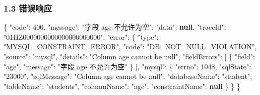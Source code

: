 \documentclass[
  a4paper,
  UTF8]{ctexart}
\newenvironment{Shaded}{}{}
\newcommand{\DataTypeTok}[1]{\textcolor[rgb]{0.56,0.13,0.00}{#1}}
\newcommand{\DecValTok}[1]{\textcolor[rgb]{0.25,0.63,0.44}{#1}}
\newcommand{\FunctionTok}[1]{\textcolor[rgb]{0.02,0.16,0.49}{#1}}
\newcommand{\KeywordTok}[1]{\textcolor[rgb]{0.00,0.44,0.13}{\textbf{#1}}}
\newcommand{\OtherTok}[1]{\textcolor[rgb]{0.00,0.44,0.13}{#1}}
\newcommand{\StringTok}[1]{\textcolor[rgb]{0.25,0.44,0.63}{#1}}
\begin{document}
\hypertarget{ux9519ux8befux54cdux5e94}{%
\subsubsection{1.3 错误响应}\label{ux9519ux8befux54cdux5e94}}

\begin{Shaded}
\begin{Highlighting}[]
\FunctionTok{\{}
  \DataTypeTok{"code"}\FunctionTok{:} \DecValTok{400}\FunctionTok{,}
  \DataTypeTok{"message"}\FunctionTok{:} \StringTok{"字段 age 不允许为空"}\FunctionTok{,}
  \DataTypeTok{"data"}\FunctionTok{:} \KeywordTok{null}\FunctionTok{,}
  \DataTypeTok{"traceId"}\FunctionTok{:} \StringTok{"01HZ0000000000000000000000"}\FunctionTok{,}
  \DataTypeTok{"error"}\FunctionTok{:} \FunctionTok{\{}
    \DataTypeTok{"type"}\FunctionTok{:} \StringTok{"MYSQL\_CONSTRAINT\_ERROR"}\FunctionTok{,}
    \DataTypeTok{"code"}\FunctionTok{:} \StringTok{"DB\_NOT\_NULL\_VIOLATION"}\FunctionTok{,}
    \DataTypeTok{"source"}\FunctionTok{:} \StringTok{"mysql"}\FunctionTok{,}
    \DataTypeTok{"details"}\FunctionTok{:} \StringTok{"Column \textquotesingle{}age\textquotesingle{} cannot be null"}\FunctionTok{,}
    \DataTypeTok{"fieldErrors"}\FunctionTok{:} \OtherTok{[}
      \FunctionTok{\{}
        \DataTypeTok{"field"}\FunctionTok{:} \StringTok{"age"}\FunctionTok{,}
        \DataTypeTok{"message"}\FunctionTok{:} \StringTok{"字段 age 不允许为空"}
      \FunctionTok{\}}
    \OtherTok{]}\FunctionTok{,}
    \DataTypeTok{"mysql"}\FunctionTok{:} \FunctionTok{\{}
      \DataTypeTok{"errno"}\FunctionTok{:} \DecValTok{1048}\FunctionTok{,}
      \DataTypeTok{"sqlState"}\FunctionTok{:} \StringTok{"23000"}\FunctionTok{,}
      \DataTypeTok{"sqlMessage"}\FunctionTok{:} \StringTok{"Column \textquotesingle{}age\textquotesingle{} cannot be null"}\FunctionTok{,}
      \DataTypeTok{"databaseName"}\FunctionTok{:} \StringTok{"student"}\FunctionTok{,}
      \DataTypeTok{"tableName"}\FunctionTok{:} \StringTok{"students"}\FunctionTok{,}
      \DataTypeTok{"columnName"}\FunctionTok{:} \StringTok{"age"}\FunctionTok{,}
      \DataTypeTok{"constraintName"}\FunctionTok{:} \KeywordTok{null}
    \FunctionTok{\}}
  \FunctionTok{\}}
\FunctionTok{\}}
\end{Highlighting}
\end{Shaded}
\end{document}
